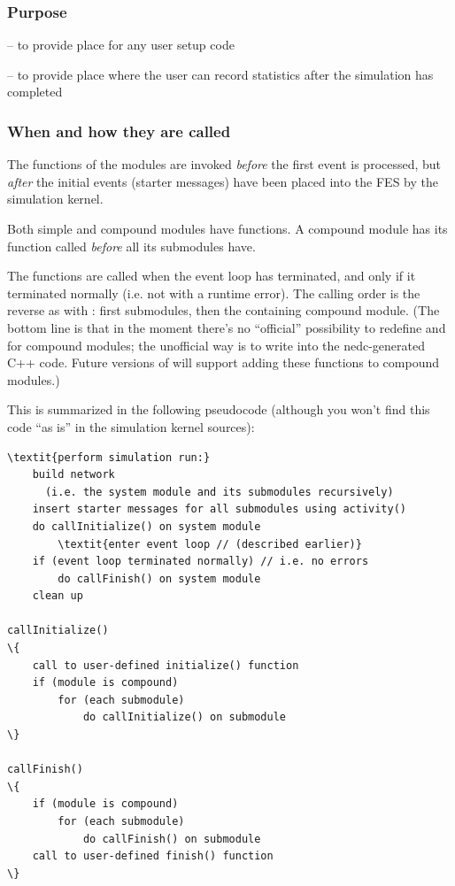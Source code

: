 \subsubsection{Purpose}


 -- to provide place for any user setup code

 -- to provide place where the user can record statistics
after the simulation has completed


\subsubsection{When and how they are called}


The  functions of the modules are invoked
\textit{before} the first event is processed, but \textit{after} the
initial events (starter messages) have been
placed into the FES by the simulation kernel.


Both simple and compound modules have  functions.
A compound module has its  function called
\textit{before} all its submodules have.


The  functions are called when the event
loop has terminated, and only if it terminated
normally (i.e. not with a runtime error).  The calling order is the
reverse as with : first submodules, then the
containing compound module. (The bottom line is that in the moment
there's no ``official'' possibility to redefine 
and  for compound modules; the unofficial way is to
write into the nedc-generated C++ code. Future versions of {\opp} will
support adding these functions to compound
modules.)

This is summarized in the following pseudocode (although you
won't find this code ``as is'' in the simulation
kernel sources):


\begin{Verbatim}[commandchars=\\\{\}]
\textit{perform simulation run:}
    build network
      (i.e. the system module and its submodules recursively)
    insert starter messages for all submodules using activity()
    do callInitialize() on system module
        \textit{enter event loop // (described earlier)}
    if (event loop terminated normally) // i.e. no errors
        do callFinish() on system module
    clean up

callInitialize()
\{
    call to user-defined initialize() function
    if (module is compound)
        for (each submodule)
            do callInitialize() on submodule
\}

callFinish()
\{
    if (module is compound)
        for (each submodule)
            do callFinish() on submodule
    call to user-defined finish() function
\}
\end{Verbatim}



